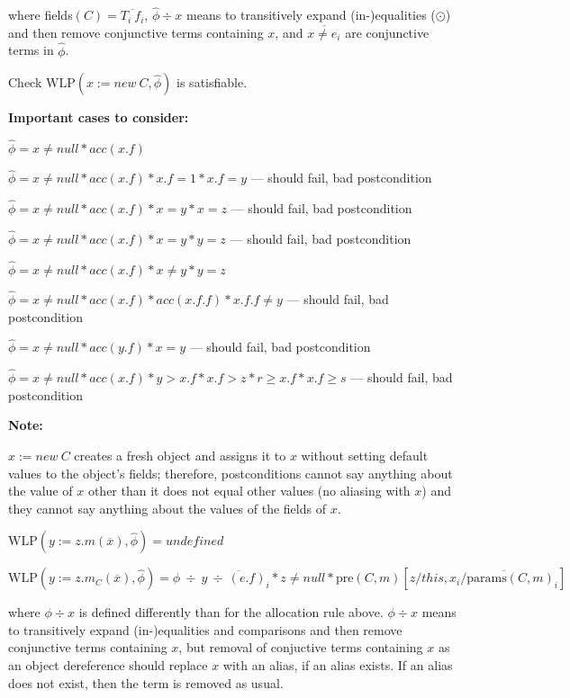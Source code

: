 \documentclass {article}
\newcommand{\fphi}{\widehat{\phi}}
\newcommand{\presub}{\text{pre}(C,m)\left[z/this, \overline{x_i/\text{params}(C,m)_i}\right]}
\newcommand{\wlp}[2]{\text{WLP}(#1,#2)}
\begin{document}
where fields$(C) = \overline{T_i \ f_i}$, $\fphi \div x$ means to transitively expand (in-)equalities ($\odot$) and then remove conjunctive terms containing $x$, and $\overline{x \neq e_i}$ are conjunctive terms in $\fphi$. 

Check $\wlp{x := new\ C}{\fphi}$ is satisfiable.

\textbf{Important cases to consider:}

$\fphi = x \neq null \ast acc(x.f)$

$\fphi = x \neq null \ast acc(x.f) \ast x.f = 1 \ast x.f = y$ --- should fail, bad postcondition

$\fphi = x \neq null \ast acc(x.f) \ast x = y \ast x = z$ --- should fail, bad postcondition

$\fphi = x \neq null \ast acc(x.f) \ast x = y \ast y = z$ --- should fail, bad postcondition

$\fphi = x \neq null \ast acc(x.f) \ast x \neq y \ast y = z$

$\fphi = x \neq null \ast acc(x.f) \ast acc(x.f.f) \ast x.f.f \neq y$ --- should fail, bad postcondition

$\fphi = x \neq null \ast acc(y.f) \ast x = y$ --- should fail, bad postcondition

$\fphi = x \neq null \ast acc(x.f) \ast y > x.f \ast x.f > z \ast r \geq x.f \ast x.f \geq s$ --- should fail, bad postcondition


\textbf{Note:}

$x := new \ C$ creates a fresh object and assigns it to $x$ without setting default values to the object's fields; therefore, postconditions cannot say anything about the value of $x$ other than it does not equal other values (no aliasing with $x$) and they cannot say anything about the values of the fields of $x$.

\vspace{0.5cm}

$\wlp{y := z.m(\overline{x})}{\fphi} = undefined$

\vspace{0.5cm}

$\wlp{y := z.m_C(\overline{x})}{\fphi} = \fphi \ \div \ y \overline{\ \div \ (e.f)_i} \ast z \neq null \ast \presub$


where $\phi \div x$ is defined differently than for the allocation rule above. $\phi \div x$ means to transitively expand (in-)equalities and comparisons and then remove conjunctive terms containing $x$, but removal of conjuctive terms containing $x$ as an object dereference should replace $x$ with an alias, if an alias exists. If an alias does not exist, then the term is removed as usual.
\end{document}
